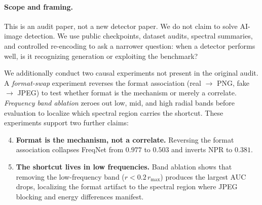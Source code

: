 \paragraph{Scope and framing.}
This is an audit paper, not a new detector paper. We do not claim to solve AI-image detection. We use public checkpoints, dataset audits, spectral summaries, and controlled re-encoding to ask a narrower question: when a detector performs well, is it recognizing generation or exploiting the benchmark?

We additionally conduct two causal experiments not present in the original audit. A \emph{format-swap} experiment reverses the format association (real $\to$ PNG, fake $\to$ JPEG) to test whether format is the mechanism or merely a correlate. \emph{Frequency band ablation} zeroes out low, mid, and high radial bands before evaluation to localize which spectral region carries the shortcut. These experiments support two further claims:
\begin{enumerate}
  \setcounter{enumi}{3}
  \item \textbf{Format is the mechanism, not a correlate.} Reversing the format association collapses FreqNet from $0.977$ to $0.503$ and inverts NPR to $0.381$.
  \item \textbf{The shortcut lives in low frequencies.} Band ablation shows that removing the low-frequency band ($r < 0.2\,r_{\max}$) produces the largest AUC drops, localizing the format artifact to the spectral region where JPEG blocking and energy differences manifest.
\end{enumerate}
